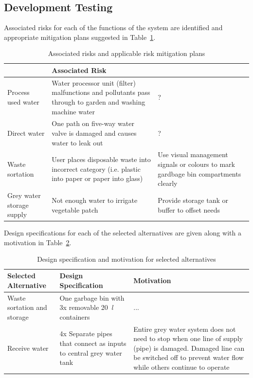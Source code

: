 \documentclass[a4paper,11pt,fleqn]{report}
\begin{document}
{\subsection{Development Testing}
Associated risks for each of the functions of the system are identified and appropriate mitigation plans suggested in Table~\ref{tb: Functional_risk_mitigation}.
%
\begin{table}[h!]
\caption {Associated risks and applicable risk mitigation plans} \label{tb: Functional_risk_mitigation} 
\begin{center}
\begin{tabular}{p{3cm}|p{5cm}|p{5cm}}\toprule
	{\textbf{Function} & \textbf{Associated Risk}} & {\textbf{Risk Mitigation}\\ \midrule
    \hline
    Process used water & Water processor unit (filter) malfunctions and pollutants pass through to garden and washing machine water & ?\\
     \hline
    Direct water & One path on five-way water valve is damaged and causes water to leak out & ?\\
     \hline
    Waste sortation & User places disposable waste into incorrect category (i.e. plastic into paper or paper into glass) & Use visual management signals or colours to mark gardbage bin compartments clearly
\\
    \hline
Grey water storage supply & Not enough water to irrigate vegetable patch & Provide storage tank or buffer to offset needs\\
    \bottomrule
\end{tabular}
\end{center}
\end{table}
%
Design specifications for each of the selected alternatives are given along with a motivation in Table~\ref{tb: Functional_design_specs}.
%
\begin{table}[h!]
\caption {Design specification and motivation for selected alternatives} \label{tb: Functional_design_specs} 
\begin{center}
\begin{tabular}{p{4.5cm}|p{4.5cm}|p{4.5cm}}\toprule
	{\textbf{Selected Alternative}} & {\textbf{Design Specification}} & {\textbf{Motivation}}\\ \midrule
    \hline
    Waste sortation and storage & One garbage bin with 3x removable 20~\textit{l} containers& ...\\
        \hline
    Receive water & 4x Separate pipes that connect as inputs to central grey water tank & Entire grey water system does not need to stop when one line of supply (pipe) is damaged. Damaged line can be switched off to prevent water flow while others continue to operate\\

\end{tabular}
\end{center}
\end{table}}
\end{document}
